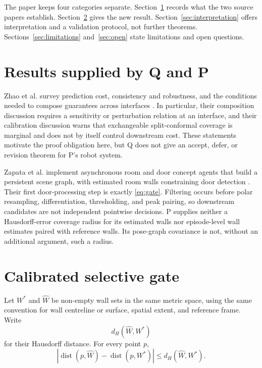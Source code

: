 \documentclass{article}
\begin{document}
The paper keeps four categories separate. Section~\ref{sec:sources} records what the two source papers establish. Section~\ref{sec:result} gives the new result. Section~\ref{sec:interpretation} offers interpretation and a validation protocol, not further theorems. Sections~\ref{sec:limitations} and~\ref{sec:open} state limitations and open questions.

\section{Results supplied by Q and P}
\label{sec:sources}

Zhao et al. survey prediction cost, consistency and robustness, and the conditions needed to compose guarantees across interfaces \cite{zhao2026laa}. %
In particular, their composition discussion requires a sensitivity or perturbation relation at an interface, and their calibration discussion warns that exchangeable split-conformal coverage is marginal and does not by itself control downstream cost. %
These statements motivate the proof obligation here, but Q does not give an accept, defer, or revision theorem for P's robot system. %

Zapata et al. implement asynchronous room and door concept agents that build a persistent scene graph, with estimated room walls constraining door detection \cite{zapata2026concept}. %
Their first door-processing step is exactly \eqref{eq:gate}. %
Filtering occurs before polar resampling, differentiation, thresholding, and peak pairing, so downstream candidates are not independent pointwise decisions. %
P supplies neither a Hausdorff-error coverage radius for its estimated walls nor episode-level wall estimates paired with reference walls. %
Its pose-graph covariance is not, without an additional argument, such a radius. %

\section{Calibrated selective gate}
\label{sec:result}

Let $W^*$ and $\widehat W$ be non-empty wall sets in the same metric space, using the same convention for wall centreline or surface, spatial extent, and reference frame. %
Write
\[
  d_H(\widehat W,W^*)
\]
for their Hausdorff distance. For every point $p$,
\begin{equation}
 \left|\operatorname{dist}(p,\widehat W)-\operatorname{dist}(p,W^*)\right|
 \leq d_H(\widehat W,W^*).
 \label{eq:setdistance}
\end{equation}
\end{document}

